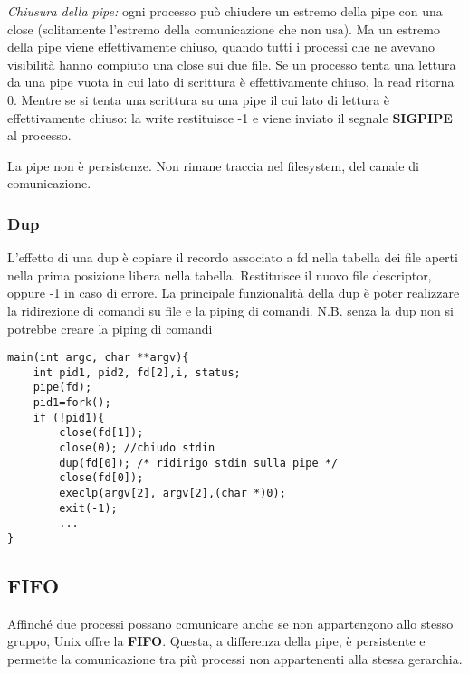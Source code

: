 \documentclass{article}
\begin{document}
 \noindent \textit{Chiusura della pipe:}
 ogni processo può chiudere un estremo della pipe con una
 close (solitamente l'estremo della comunicazione che non usa).
 Ma un estremo della pipe viene effettivamente chiuso, quando tutti
 i processi che ne avevano visibilità hanno compiuto una close sui due file.
 Se un processo tenta una lettura da una pipe vuota in cui
 lato di scrittura è effettivamente chiuso, la read ritorna 0.
 Mentre se si tenta una scrittura su una pipe il cui lato di lettura
 è effettivamente chiuso: la write restituisce -1 e viene inviato 
 il segnale \textbf{SIGPIPE} al processo.
\medskip

\noindent La pipe non è persistenze. Non rimane traccia nel filesystem, 
del canale di comunicazione.

 \subsubsection{Dup}
 \noindent {} 
 \medskip 

\noindent L'effetto di una dup è copiare il recordo associato a fd nella tabella dei file aperti 
nella prima posizione libera nella tabella.
Restituisce il nuovo file descriptor, oppure -1 in caso di errore.
La principale funzionalità della dup è poter realizzare la ridirezione di comandi su file e la piping di comandi.
N.B. senza la dup non si potrebbe creare la piping di comandi 

\begin{lstlisting}[style=CStyle]
main(int argc, char **argv){ 
    int pid1, pid2, fd[2],i, status;
    pipe(fd);
    pid1=fork();
    if (!pid1){
        close(fd[1]);
        close(0); //chiudo stdin
        dup(fd[0]); /* ridirigo stdin sulla pipe */
        close(fd[0]);
        execlp(argv[2], argv[2],(char *)0);
        exit(-1);
        ...
}
\end{lstlisting}

\subsection{FIFO}
Affinché due processi possano comunicare anche se non appartengono allo stesso gruppo,
Unix offre la \textbf{FIFO}. Questa, a differenza della pipe, è persistente e permette la 
comunicazione tra più processi non appartenenti alla stessa gerarchia.
\end{document}

